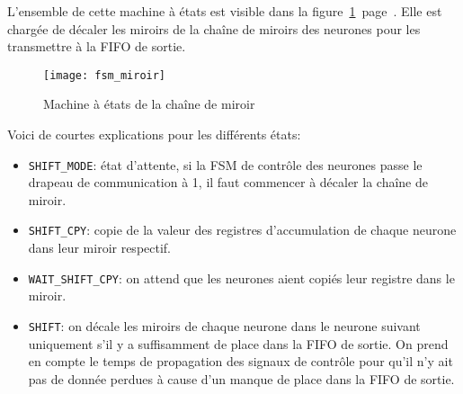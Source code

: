 L'ensemble de cette machine à états est visible dans la
figure~\ref{fig:fsm_miroir}~page~\pageref{fig:fsm_miroir}.
Elle est chargée de décaler les miroirs de la chaîne de miroirs des neurones
pour les transmettre à la FIFO de sortie.

\begin{figure}[h!]
	\texttt{[image: fsm\_miroir]}
	\caption{Machine à états de la chaîne de miroir}
	\label{fig:fsm_miroir}
\end{figure}

Voici de courtes explications pour les différents états:
\begin{itemize}
	\item \verb+SHIFT_MODE+: état d'attente, si la FSM de contrôle des neurones
		passe le drapeau de communication à 1, il faut commencer à décaler
		la chaîne de miroir.
	\item \verb+SHIFT_CPY+: copie de la valeur des registres d'accumulation
		de chaque neurone dans leur miroir respectif.
	\item \verb+WAIT_SHIFT_CPY+: on attend que les neurones aient copiés leur
		registre dans le miroir.
	\item \verb+SHIFT+: on décale les miroirs de chaque neurone dans le neurone suivant
		uniquement s'il y a suffisamment de place dans la FIFO de sortie. On prend en compte
		le temps de propagation des signaux de contrôle pour qu'il n'y ait pas de donnée perdues
		à cause d'un manque de place dans la FIFO de sortie.
\end{itemize}


